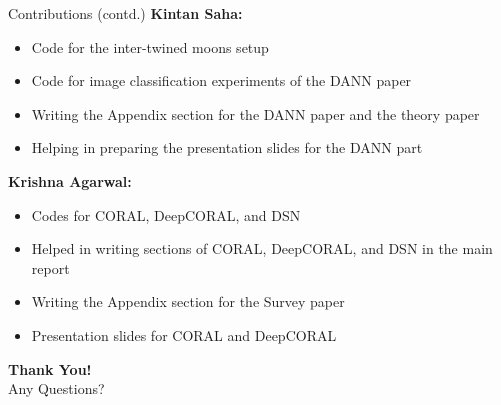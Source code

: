 \documentclass{beamer}
\begin{document}
\begin{frame}{Contributions (contd.)}
\textbf{Kintan Saha:}
\begin{itemize}
    \item Code for the inter-twined moons setup
    \item Code for image classification experiments of the DANN paper
    \item Writing the Appendix section for the DANN paper and the theory paper
    \item Helping in preparing the presentation slides for the DANN part
\end{itemize}

\vspace{0.5em}
\textbf{Krishna Agarwal:}
\begin{itemize}
\item Codes for CORAL, DeepCORAL, and DSN
    \item Helped in writing sections of CORAL, DeepCORAL, and DSN in the main report
    \item Writing the Appendix section for the Survey paper
    \item Presentation slides for CORAL and DeepCORAL
\end{itemize}
\end{frame}

\begin{frame}[c]
\centering
\Huge{\textbf{Thank You!}}\\[1em]
\LARGE{Any Questions?}
\end{frame}
\end{document}
